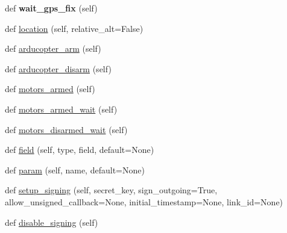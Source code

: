 \begin{DoxyCompactItemize}
\item 
\mbox{\label{classpymavlink_1_1mavutil_1_1mavfile_a270d661451b79fd6f15c2ffeb42304a6}} 
def {\bfseries wait\+\_\+gps\+\_\+fix} (self)
\item 
def \hyperlink{classpymavlink_1_1mavutil_1_1mavfile_a15c2f7419959d23ebf1729bbd7871905}{location} (self, relative\+\_\+alt=False)
\item 
def \hyperlink{classpymavlink_1_1mavutil_1_1mavfile_ab9d8c0609102dc488eeb537a2d1c94fe}{arducopter\+\_\+arm} (self)
\item 
def \hyperlink{classpymavlink_1_1mavutil_1_1mavfile_affeb5fa286a50594954bd0e15c43718e}{arducopter\+\_\+disarm} (self)
\item 
def \hyperlink{classpymavlink_1_1mavutil_1_1mavfile_a335d09b6fa521448d97ea2597d0387c0}{motors\+\_\+armed} (self)
\item 
def \hyperlink{classpymavlink_1_1mavutil_1_1mavfile_a05ead7d3ad2e1228d222592ab34e8585}{motors\+\_\+armed\+\_\+wait} (self)
\item 
def \hyperlink{classpymavlink_1_1mavutil_1_1mavfile_aff2ed2950af9ff7a504b1a304288d019}{motors\+\_\+disarmed\+\_\+wait} (self)
\item 
def \hyperlink{classpymavlink_1_1mavutil_1_1mavfile_ae2070e90f4df43fc8b44ae29a9a996ed}{field} (self, type, field, default=None)
\item 
def \hyperlink{classpymavlink_1_1mavutil_1_1mavfile_af62c2fd5d5957067fd74eef6c08dcd9a}{param} (self, name, default=None)
\item 
def \hyperlink{classpymavlink_1_1mavutil_1_1mavfile_a0ba591be56a6a76483d5a7480512406b}{setup\+\_\+signing} (self, secret\+\_\+key, sign\+\_\+outgoing=True, allow\+\_\+unsigned\+\_\+callback=None, initial\+\_\+timestamp=None, link\+\_\+id=None)
\item 
def \hyperlink{classpymavlink_1_1mavutil_1_1mavfile_abd262cadb041fdae939dbfb49219f4be}{disable\+\_\+signing} (self)
\end{DoxyCompactItemize}
